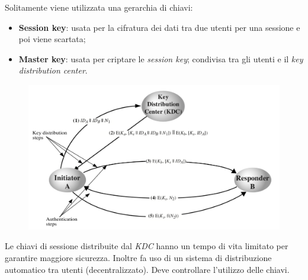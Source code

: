 \documentclass[11pt, a4paper, twoside, italian]{report}
\theoremstyle{plain}
\begin{document}
\begin{multicols}{2}
\noindent
Solitamente viene utilizzata una gerarchia di chiavi:
\begin{itemize}
	\item \textbf{Session key}: usata per la cifratura dei dati tra due utenti per una sessione e poi viene scartata;
	\item \textbf{Master key}: usata per criptare le \textit{session key}; condivisa tra gli utenti e il \textit{key distribution center}.
\end{itemize}
\columnbreak
\begin{figure}[H]
	\centering
	\includegraphics[scale=0.4]{keydist}
\end{figure}
\end{multicols}
\noindent
Le chiavi di sessione distribuite dal \textit{KDC} hanno un tempo di vita limitato per garantire maggiore sicurezza. Inoltre fa uso di un sistema di distribuzione automatico tra utenti (decentralizzato). Deve controllare l'utilizzo delle chiavi.
\end{document}

